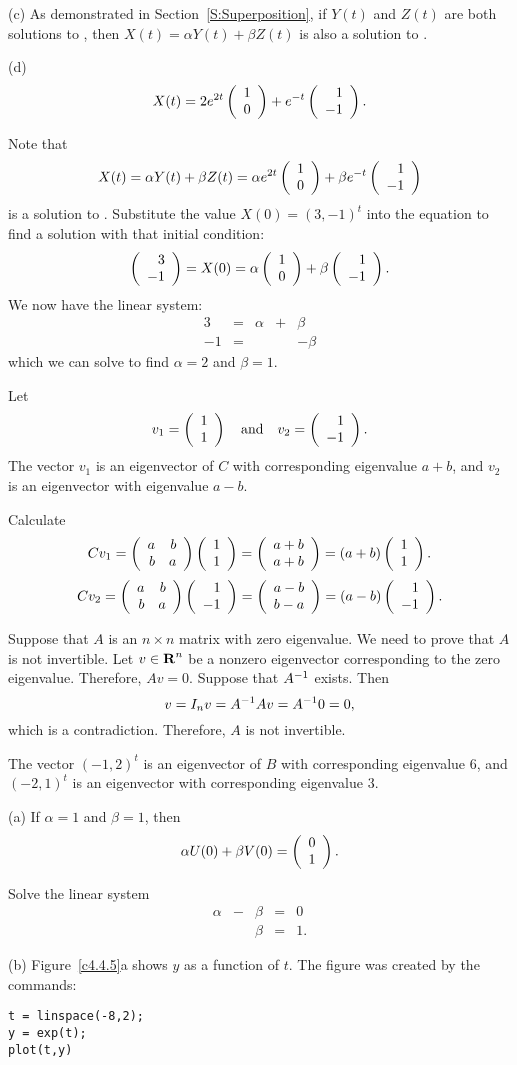\documentclass{ximera}
\begin{document}
(c) As demonstrated in Section~\ref{S:Superposition}, if
$Y(t)$ and $Z(t)$ are both solutions to
, then $X(t) = \alpha Y(t) + \beta Z(t)$ is also
a solution to .

(d) \ans 
\[
X(t) = 2e^{2t}\left(\begin{array}{r} 1 \\ 0\end{array}\right) + e^{-t}\left(\begin{array}{r} 1 \\ -1\end{array}\right).
\]

\soln Note that
\[ X(t) = \alpha Y(t) + \beta Z(t) = \alpha e^{2t}\left(\begin{array}{r} 1 \\ 0\end{array}\right)
+ \beta e^{-t}\left(\begin{array}{r} 1 \\ -1\end{array}\right) \]
is a solution to .  Substitute the value
$X(0) = (3,-1)^t$  into the equation to find a solution with that
initial condition:
\[
\left(\begin{array}{r} 3 \\ -1\end{array}\right) = X(0) = \alpha\left(\begin{array}{r} 1 \\ 0\end{array}\right) +
\beta\left(\begin{array}{r} 1 \\ -1\end{array}\right).
\]
We now have the linear system:
\[ \begin{array}{rrrrr}
3 & = & \alpha & + & \beta \\
-1 & = & & & -\beta \end{array} \]
which we can solve to find $\alpha = 2$ and $\beta = 1$.

\ans Let
\[ v_1 = \left(\begin{array}{r} 1 \\ 1\end{array}\right) \quad\mbox{and}\quad v_2 = \left(\begin{array}{r} 1 \\ -1\end{array}\right). \]
The vector $v_1$ is an eigenvector of $C$ with corresponding
eigenvalue $a + b$, and $v_2$ is an eigenvector with eigenvalue $a - b$.

\soln Calculate
\[ Cv_1 = \left(\begin{array}{rr} a & b\\ b &a\end{array}\right)\left(\begin{array}{r} 1 \\ 1\end{array}\right) = \left(\begin{array}{r} a + b \\ a + b\end{array}\right) =
(a + b)\left(\begin{array}{r} 1 \\ 1\end{array}\right). \]
\[ Cv_2 = \left(\begin{array}{rr} a & b\\ b &a\end{array}\right)\left(\begin{array}{r} 1 \\ -1\end{array}\right) = \left(\begin{array}{r} a - b \\ b - a\end{array}\right) =
(a - b)\left(\begin{array}{r} 1 \\ -1\end{array}\right). \]

Suppose that $A$ is an $n\times n$ matrix with zero eigenvalue.  We need to
prove that $A$ is not invertible.  Let $v\in\mbox{$\bf{R}$}^n$ be a nonzero 
eigenvector corresponding to the zero eigenvalue.  Therefore, $Av=0$. 
Suppose that $A^{-1}$ exists.  Then
\[
v = I_nv = A^{-1} Av = A^{-1} 0 = 0,
\]
which is a contradiction.  Therefore, $A$ is not invertible.

 The vector $(-1,2)^t$ is an eigenvector of $B$ with
corresponding eigenvalue $6$, and $(-2,1)^t$ is an eigenvector with
corresponding eigenvalue $3$.

(a) \ans If $\alpha = 1$ and $\beta = 1$, then
\[
\alpha U(0) + \beta V(0) = \left(\begin{array}{r} 0 \\ 1\end{array}\right). 
\]

\soln Solve the linear system
\[
\begin{array}{rrrrl}
\alpha & - & \beta & = & 0 \\
& & \beta & = & 1. \end{array}
\]

(b) Figure~\ref{c4.4.5}a shows $y$ as a function of $t$.  The figure
was created by the \Matlab commands:
\begin{verbatim}
t = linspace(-8,2);
y = exp(t);
plot(t,y)
\end{verbatim}
\end{document}
